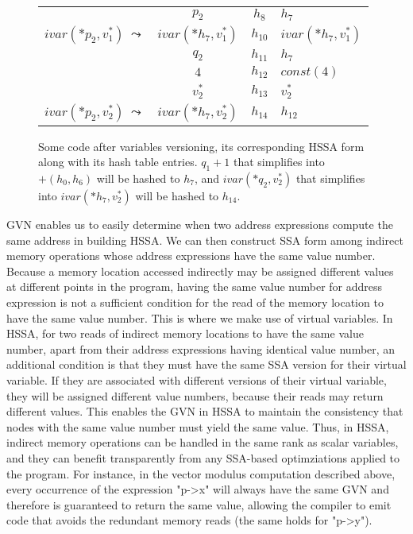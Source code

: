 \begin{figure}
\begin{center}
{\begin{tabular}{rc|c|l}
    &$p_2$                 & $h_8$   & $h_7$\\
    $ivar(*p_2,v^*_1)\ \leadsto$& $ivar(*h_7,v^*_1)$      & $h_{10}$ &$ivar(*h_7,v^*_1)$\\
    &$q_2$                 & $h_{11}$ & $h_7$\\
    &$4$                   & $h_{12}$ & $const(4)$\\
    &$v^*_2$               & $h_{13}$   &  $v^*_2$\\
    $ivar(*p_2,v^*_2)\ \leadsto$& $ivar(*h_7,v^*_2)$      & $h_{14}$ &$h_{12}$\\
  \end{tabular}
}
\end{center}
\caption{\label{fig:hssa:versioning}Some code after variables versioning, its corresponding HSSA form along with its hash table entries. $q_1+1$ that simplifies into $ +(h_0,h_6)$ will be hashed to $h_7$, and $ivar(*q_2,v^*_2)$ that simplifies into $ivar(*h_7,v^*_2)$ will be hashed to $h_{14}$.
}
\end{figure}

GVN enables us to easily determine when two address expressions compute the same
address in building HSSA.  We can then construct SSA form among indirect memory
operations whose address expressions have the same value number.  Because a
memory location accessed indirectly may be assigned different values at 
different points in the program, having the same value number for address 
expression is not a sufficient condition for the read of the memory location to
have the same value number.  This is where we make use of virtual variables.
In HSSA, for two reads of indirect memory locations to have the same value
number, apart from their address expressions having identical value number,
an additional condition is that they must have the same SSA version for
their virtual variable.  If they are associated with different versions of their
virtual variable, they will be assigned different value numbers, because their
reads may return different values.  This enables the GVN in HSSA to maintain the
consistency that nodes with the same value number must yield the same value.
Thus, in HSSA, indirect memory operations can be handled in the same rank as
scalar variables, and they can benefit transparently from any SSA-based 
optimziations applied to the program.
For instance, in the vector modulus computation described above, every occurrence of the expression "p-\textgreater x" will always have the same GVN and therefore is guaranteed to return the same value, allowing the compiler to emit code that avoids the redundant memory reads (the same holds for "p-\textgreater y").

